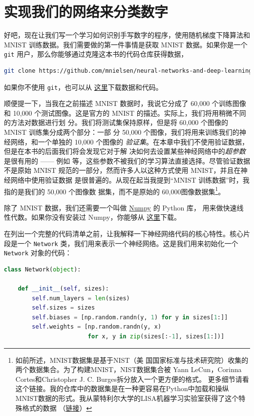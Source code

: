 \section{实现我们的网络来分类数字}
\label{sec:implementing_our_network_to_classify_digits}

好吧，现在让我们写一个学习如何识别手写数字的程序，使用随机梯度下降算法和 MNIST
训练数据。我们需要做的第一件事情是获取 MNIST 数据。如果你是一个 \lstinline!git!
用户，那么你能够通过克隆这本书的代码仓库获得数据，

\begin{lstlisting}[language=sh]
git clone https://github.com/mnielsen/neural-networks-and-deep-learning.git
\end{lstlisting}

如果你不使用 \lstinline!git!，也可以从%
\href{https://github.com/mnielsen/neural-networks-and-deep-learning/archive/master.zip}{
  这里}下载数据和代码。

顺便提一下，当我在之前描述 MNIST 数据时，我说它分成了 60,000 个训练图像和 10,000
个测试图像。这是官方的 MNIST 的描述。实际上，我们将用稍微不同的方法对数据进行划
分。我们将测试集保持原样，但是将 60,000 个图像的 MNIST 训练集分成两个部分：一部
分 50,000 个图像，我们将用来训练我们的神经网络，和一个单独的 10,000 个图像的%
\emph{验证集}。在本章中我们不使用验证数据，但是在本书的后面我们将会发现它对于解
决如何去设置某些神经网络中的\emph{超参数}是很有用的 —— 例如%
\learningrate{}等，这些参数不被我们的学习算法直接选择。尽管验证数据不是原始
MNIST 规范的一部分，然而许多人以这种方式使用 MNIST，并且在神经网络中使用验证数据
是很普遍的。从现在起当我提到“MNIST 训练数据”时，我指的是我们的 50,000 个图像数
据集，而不是原始的 60,000图像数据集\footnote{如前所述，MNIST数据集是基于NIST（美
    国国家标准与技术研究院）收集的两个数据集合。为了构建MNIST，NIST数据集合被
  Yann LeCun，Corinna Cortes和Christopher J. C. Burges拆分放入一个更方便的格式。
  更多细节请看这个链接。我的仓库中的数据集是在一种更容易在Python中加载和操纵
  MNIST数据的形式。我从蒙特利尔大学的LISA机器学习实验室获得了这个特殊格式的数据
  （\href{http://www.deeplearning.net/tutorial/gettingstarted.html}{链接}）}。

除了 MNIST 数据，我们还需要一个叫做 \href{http://numpy.org/}{Numpy} 的 Python 库，
用来做快速线性代数。如果你没有安装过 Numpy，你能够从%
\href{http://www.scipy.org/install.html}{这里}下载。

在列出一个完整的代码清单之前，让我解释一下神经网络代码的核心特性。核心片段是一个
\lstinline!Network! 类，我们用来表示一个神经网络。这是我们用来初始化一个
\lstinline!Network! 对象的代码：
\begin{lstlisting}[language=Python]
class Network(object):

	def __init__(self, sizes):
		self.num_layers = len(sizes)
		self.sizes = sizes
		self.biases = [np.random.randn(y, 1) for y in sizes[1:]]
		self.weights = [np.random.randn(y, x)
						for x, y in zip(sizes[:-1], sizes[1:])]
\end{lstlisting}

